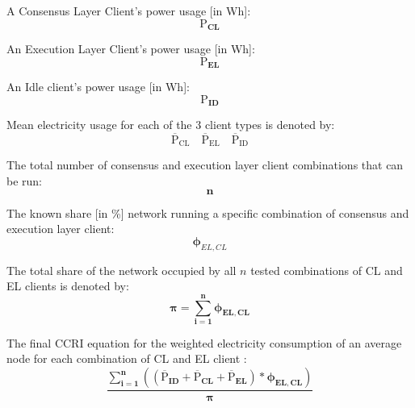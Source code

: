 \begin{center}
A Consensus Layer Client's power usage [in Wh]:
\begin{equation*}
    \boldsymbol{\mathrm{P}_{CL}}
\end{equation*}

An Execution Layer Client's power usage [in Wh]:
\begin{equation*}
    \boldsymbol{\mathrm{P}_{EL}}
\end{equation*}
 
 An Idle client's power usage [in Wh]:
 \begin{equation*}
    \boldsymbol{\mathrm{P}_{ID}}
\end{equation*} 

Mean electricity usage for each of the 3 client types is denoted by: 
\begin{equation*}
  \boldsymbol{\mathrm{{\overline{P}}_{CL}}}\quad      \boldsymbol{\mathrm{{\overline{P}}_{EL}}}\quad  \boldsymbol{\mathrm{{\overline{P}}_{ID}}}   
\end{equation*}

The total number of consensus and execution layer client combinations that can be run:
\begin{equation*}
    \boldsymbol{n}
\end{equation*}

The known share [in \%] network running a specific combination of consensus and execution layer client:
\begin{equation*}
    \boldsymbol{\phi}_{EL,CL} 
\end{equation*}

The total share of the network occupied by all ${n}$ tested combinations of CL and EL clients is denoted by:
\begin{equation*}
    \boldsymbol{{\pi} = \displaystyle\sum\limits_{i=1}^{n}{\phi_{EL,CL}}}
\end{equation*}

The final CCRI equation for the weighted electricity consumption of an average node for each combination of CL and EL client \cite{CryptoCarbonRatingsInstitute2022TheNetwork}: 
\label{CCRIBaseEqnSection}
\begin{equation}
\boldsymbol{\frac{\displaystyle\sum\limits_{i=1}^{n}{ \left({\left(\mathrm{\overline{P}}_{ID} + \mathrm{\overline{P}}_{CL} + \mathrm{\overline{P}}_{EL}\right)} * {\phi_{EL,CL}} \right)}}
 {\pi}}\label{eqn:CCRI}
\end{equation}
\end{center}


